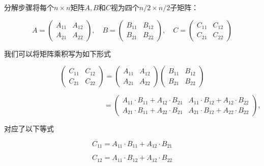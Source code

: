 \documentclass[lang=cn,newtx,10pt,scheme=chinese]{elegantbook}
\begin{document}
分解步骤将每个$n \times n$矩阵$A, B$和$C$视为四个$n / 2 \times n / 2$子矩阵：

\begin{equation}
A=\left(\begin{array}{ll}
A_{11} & A_{12} \\
A_{21} & A_{22}
\end{array}\right), \quad B=\left(\begin{array}{ll}
B_{11} & B_{12} \\
B_{21} & B_{22}
\end{array}\right), \quad C=\left(\begin{array}{ll}
C_{11} & C_{12} \\
C_{21} & C_{22}
\end{array}\right)
\end{equation}

我们可以将矩阵乘积写为如下形式

\begin{equation}
\left(\begin{array}{ll}
C_{11} & C_{12} \\
C_{21} & C_{22}
\end{array}\right)=\left(\begin{array}{ll}
A_{11} & A_{12} \\
A_{21} & A_{22}
\end{array}\right)\left(\begin{array}{ll}
B_{11} & B_{12} \\
B_{21} & B_{22}
\end{array}\right)
\end{equation}

\begin{equation}
\quad\quad\quad\quad\quad\quad\quad\quad\quad\quad\quad\quad\quad\quad
=\left(\begin{array}{cc}
A_{11} \cdot B_{11}+A_{12} \cdot B_{21} & A_{11} \cdot B_{12}+A_{12} \cdot B_{22} \\
A_{21} \cdot B_{11}+A_{22} \cdot B_{21} & A_{21} \cdot B_{12}+A_{22} \cdot B_{22}
\end{array}\right),
\end{equation}

对应了以下等式

\begin{equation}
C_{11}=A_{11} \cdot B_{11}+A_{12} \cdot B_{21}
\end{equation}

\begin{equation}
C_{12}=A_{11} \cdot B_{12}+A_{12} \cdot B_{22}
\end{equation}
\end{document}
